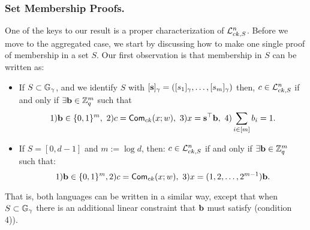 \subsubsection{Set Membership Proofs.} One of the keys to our result is a proper characterization of  $\mathcal{L}^{n}_{ck,S}$. Before we move to the aggregated case, we start by discussing how to make one single proof of membership in a set $S$. Our first observation is that  
 membership in $S$ can be written as:
\begin{itemize}
\item If $S \subset \mathbb{G}_{\gamma}$, and we identify $S$ with $[\mathbf{s}]_\gamma=([s_1]_\gamma,\ldots,[s_m]_\gamma)$ then, 
$c \in \mathcal{L}^{n}_{ck,S}$ if and only if $\exists \mathbf{b} \in \mathbb{Z}_q^{m}$ such that
\vspace{-0.4cm}
$$ 1) \mathbf{b} \in \{0,1\}^{m}, \ 2) c=\mathsf{Com}_{ck}(x;w), \ 3) x=\mathbf{s}^{\top} \mathbf{b}, \ 4) \sum_{i \in [m]} b_i=1.$$
\vspace{-0.2cm}
\item If $S=[0,d-1]$ and $m:=\log d$, then: 
$c \in \mathcal{L}^{n}_{ck,S}$ if and only if $\exists \mathbf{b} \in \mathbb{Z}_q^{m}$ such that:   
\vspace{-0.2cm}
$$ 1) \mathbf{b} \in \{0,1\}^{m}, 2) c=\mathsf{Com}_{ck}(x;w), \ 3) x=(1,2,\ldots,2^{m-1}) \mathbf{b} .$$
\end{itemize} 
\vspace{-0.2cm}
That is, both languages can be written in a similar way, except that when $S \subset \mathbb{G}_{\gamma}$ there is an additional linear constraint that $\mathbf{b}$ must satisfy (condition 4)). 

